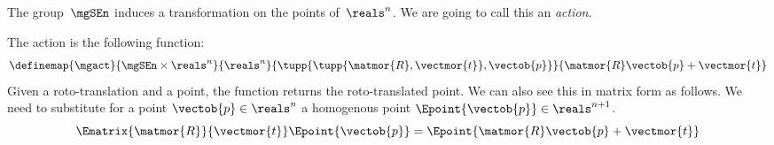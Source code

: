 %

The group~$\mgSEn$ induces a transformation on the points of~$\reals^n$.
We are going to call this an \emph{action}.

The action is the following function:
%
\begin{equation}
    \label{eq:apply}
    \definemap{\mgact}{\mgSEn \times \reals^n}{\reals^n}{\tupp{ \tupp{\matmor{R}, \vectmor{t}}, \vectob{p}}}{\matmor{R}\vectob{p} + \vectmor{t}}
\end{equation}
Given a roto-translation and a point, the function returns the roto-translated point.
%
We can also see this in matrix form as follows.
We need to substitute for a point $\vectob{p} \in \reals^n$ a homogenous point
$ \Epoint{\vectob{p}} \in \reals^{n+1}$.
%
\begin{equation}
    \label{eq:homogenous}
    \Ematrix{\matmor{R}}{\vectmor{t}}
    \Epoint{\vectob{p}}
    =
    \Epoint{\matmor{R}\vectob{p} + \vectmor{t}}
\end{equation}




